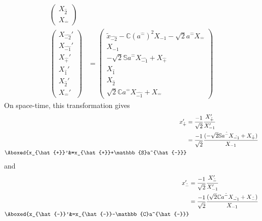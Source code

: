 \documentclass[]{article}
\numberwithin{equation}{section}
\begin{document}
{{\begin{align}
\begin{pmatrix}
    {X}_{\hat{2}}\\
    {X}_{\hat{-}}
    \end{pmatrix}\\
    \begin{pmatrix}
    {X}_{\hat{-2}}'\\
    {X}_{\hat{-1}}'\\
    {X}_{\hat{+}}'\\
    {X}_{\hat{1}}'\\
    {X}_{\hat{2}}'\\
    {X}_{\hat{-}}'
    \end{pmatrix}&= \begin{pmatrix}
    \tilde{x}_{\hat{-2}}-\mathbb{C}(a^{\hat{-}})^2{X}_{-1}-\sqrt{2}a^{\hat{-}}{X}_{\hat{-}}\\
    {X}_{-1}\\
    -\sqrt{2}\mathbb{S}a^{\hat{-}}{X}_{\hat{-1}}+{X}_{\hat{+}}\\
    {X}_{\hat{1}}\\
    {X}_{\hat{2}}\\
    \sqrt{2}\mathbb{C}a^{\hat{-}}{X}_{\hat{-1}}+{X}_{\hat{-}}
    \end{pmatrix}
\end{align}
On space-time, this transformation gives
\begin{align}
    x_{\hat{+}}'&=\frac{-1}{\sqrt{2}}\frac{{X}_{{\hat{+}}}'}{ {X}_{-1}'}\\
    &=\frac{-1}{\sqrt{2}}\frac{(-\sqrt{2}\mathbb{S}a^{\hat{-}}{X}_{\hat{-1}}+{X}_{\hat{+}})}{{X}_{-1}}\\
    \Aboxed{x_{\hat{+}}'&=x_{\hat{+}}+\mathbb{S}a^{\hat{-}}}
\end{align}
and
\begin{align}
    x_{\hat{-}}'&=\frac{-1}{\sqrt{2}}\frac{{X}_{{\hat{-}}}'}{ {X}_{-1}'}\\
    &=\frac{-1}{\sqrt{2}}\frac{(\sqrt{2}\mathbb{C}a^{\hat{-}}{X}_{\hat{-1}}+{X}_{\hat{-}})}{{X}_{-1}}\\
    \Aboxed{x_{\hat{-}}'&=x_{\hat{-}}-\mathbb{C}a^{\hat{-}}}
\end{align}
}}
\end{document}
